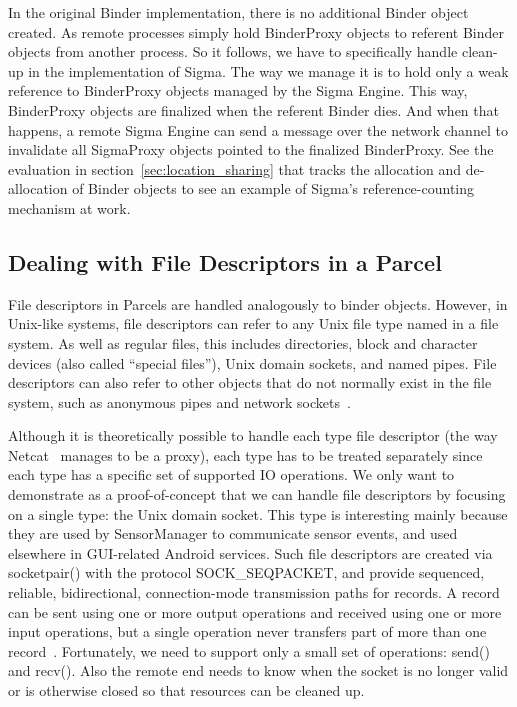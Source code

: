 \documentclass[prodmode]{acmlarge}
\begin{document}
In the original Binder implementation, there is no additional Binder object created. As remote processes simply hold BinderProxy objects to referent Binder objects from another process. So it follows, we have to specifically handle clean-up in the implementation of Sigma. The way we manage it is to hold only a weak reference to BinderProxy objects managed by the Sigma Engine. This way, BinderProxy objects are finalized when the referent Binder dies. And when that happens, a remote Sigma Engine can send a message over the network channel to invalidate all SigmaProxy objects pointed to the finalized BinderProxy. See the evaluation in section~\ref{sec:location_sharing} that tracks the allocation and de-allocation of Binder objects to see an example of Sigma's reference-counting mechanism at work.

\subsection{Dealing with File Descriptors in a Parcel}
File descriptors in Parcels are handled analogously to binder objects. However, in Unix-like systems, file descriptors can refer to any Unix file type named in a file system. As well as regular files, this includes directories, block and character devices (also called ``special files''), Unix domain sockets, and named pipes. File descriptors can also refer to other objects that do not normally exist in the file system, such as anonymous pipes and network sockets~\cite{UnixDomainSocket}.

Although it is theoretically possible to handle each type file descriptor (the way Netcat~\cite{NetCatProxy} manages to be a proxy), each type has to be treated separately since each type has a specific set of supported IO operations. We only want to demonstrate as a proof-of-concept that we can handle file descriptors by focusing on a single type: the Unix domain socket. This type is interesting mainly because they are used by SensorManager to communicate sensor events, and used elsewhere in GUI-related Android services. Such file descriptors are created via socketpair() with the protocol SOCK\_SEQPACKET, and provide sequenced, reliable, bidirectional, connection-mode transmission paths for records. A record can be sent using one or more output operations and received using one or more input operations, but a single operation never transfers part of more than one record~\cite{SocketManPage}. Fortunately, we need to support only a small set of operations: send() and recv(). Also the remote end needs to know when the socket is no longer valid or is otherwise closed so that resources can be cleaned up.
\end{document}
